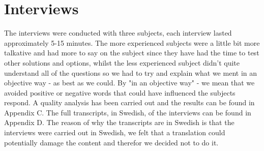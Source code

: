 \documentclass[a4paper,oneside]{bth} %
\begin{document}
				
				
				
			\section{Interviews}
			The interviews were conducted with three subjects, each interview lasted approximately 5-15 minutes. 
			The more experienced subjects were a little bit more talkative and had more to say on the subject since they have had the time to test other solutions and options, whilst the less experienced subject didn't quite understand all of the questions so we had to try and explain what we ment in an objective way - as best as we could.
			By "in an objective way" - we mean that we avoided positive or negative words that could have influenced the subjects respond.
			A quality analysis has been carried out and the results can be found in Appendix C.
			The full transcripts, in Swedish, of the interviews can be found in Appendix D. The reason of why the transcripts are in Swedish is that the interviews were carried out in Swedish, we felt that a translation could potentially damage the content and therefor we decided not to do it.\\
			
\end{document}

